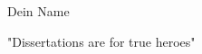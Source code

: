 \begin{titlepage}
\vspace*{-3cm}

\vspace{3cm}
\begin{center}{Dein Name}\end{center}
\vspace{0.0cm}
\begin{center}{"Dissertations are for true heroes"}\end{center}
\end{titlepage}
